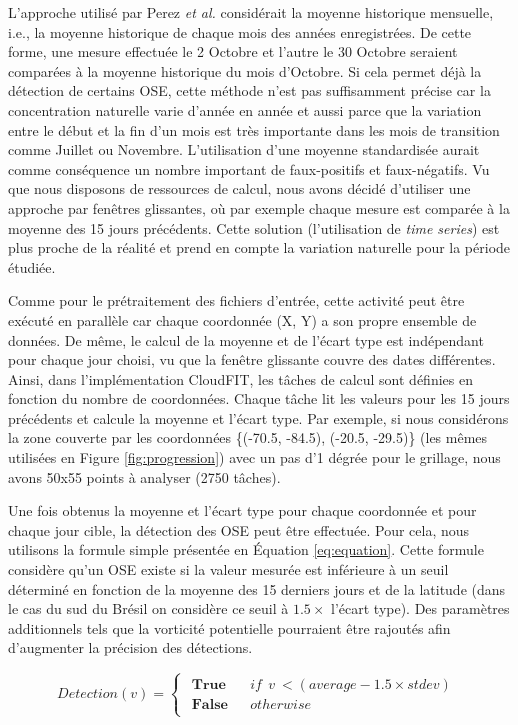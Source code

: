 L'approche utilisé par Perez \textit{et al. }\cite{Peres2013} considérait la moyenne historique mensuelle, i.e., la moyenne historique de chaque mois des années enregistrées. De cette forme, une mesure effectuée le 2 Octobre et l'autre le 30 Octobre seraient comparées à la moyenne historique du mois d'Octobre. Si cela permet déjà la détection de certains OSE, cette méthode n'est pas suffisamment précise car la concentration naturelle varie d'année en année et aussi parce que la variation entre le début et la fin d'un mois est très importante dans les mois de transition comme Juillet ou Novembre. L'utilisation d'une moyenne standardisée aurait comme conséquence un nombre important de faux-positifs et faux-négatifs. Vu que nous disposons de ressources de calcul, nous avons décidé d'utiliser une approche par fenêtres glissantes, où par exemple chaque mesure est comparée à la moyenne des 15 jours précédents. Cette solution (l'utilisation de \textit{time series}) est plus proche de la réalité et prend en compte la variation naturelle pour la période étudiée.

Comme pour le prétraitement des fichiers d'entrée, cette activité peut être exécuté en parallèle car chaque coordonnée (X, Y) a son propre ensemble de données. De même, le calcul de la moyenne et de l'écart type est indépendant pour chaque jour choisi, vu que la fenêtre glissante couvre des dates différentes. Ainsi, dans l'implémentation CloudFIT, les tâches de calcul sont définies en fonction du nombre de coordonnées. Chaque tâche lit les valeurs pour les 15 jours précédents et calcule la moyenne et l'écart type. Par exemple, si nous considérons la zone couverte par les coordonnées \{(-70.5, -84.5), (-20.5, -29.5)\} (les mêmes utilisées en Figure \ref{fig:progression}) avec un pas d'1 dégrée pour le grillage, nous avons 50x55 points à analyser (2750 tâches). 

Une fois obtenus la moyenne et l'écart type pour chaque coordonnée et pour chaque jour cible, la détection des OSE peut être effectuée.  Pour cela, nous utilisons la formule simple présentée en Équation \ref{eq:equation}. Cette formule considère qu'un OSE existe si la valeur mesurée est inférieure à un seuil déterminé en fonction de la moyenne des 15 derniers jours et de la latitude (dans le cas du sud du Brésil on considère ce seuil à $1.5 \times$ l'écart type). Des paramètres additionnels tels que la vorticité potentielle pourraient être rajoutés afin d'augmenter la précision des détections.

\begin{equation}
Detection(v)=\left\{ \begin{array}{c}
\begin{array}{lll}
\textbf{True} & &if \:\: v \:< (average - 1.5\times stdev)\\
\textbf{False} & &otherwise\end{array}\end{array}\right.
\label{eq:equation}
\end{equation}



